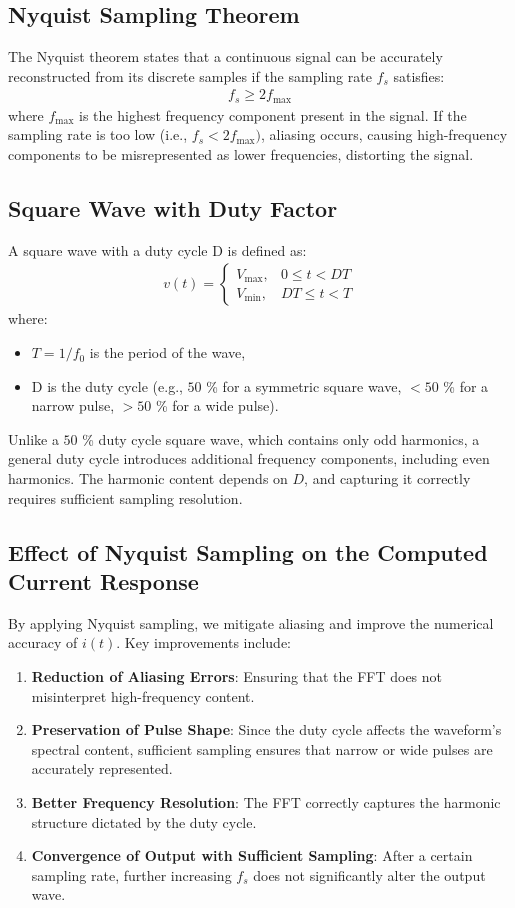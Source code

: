 \documentclass[journal]{IEEEtran}
\begin{document}
\subsection{Nyquist Sampling Theorem}
The Nyquist theorem states that a continuous signal can be accurately reconstructed from its discrete samples if the sampling rate $f_s$ satisfies:
\begin{align}
    f_s \geq 2 f_{\max}
\end{align}
where $f_{\max}$ is the highest frequency component present in the signal. If the sampling rate is too low (i.e., $f_s < 2 f_{\max})$, aliasing occurs, causing high-frequency components to be misrepresented as lower frequencies, distorting the signal.
\subsection{Square Wave with Duty Factor}
A square wave with a duty cycle D is defined as:
\begin{align}
    v(t) =
\begin{cases}
V_{\max}, & 0 \leq t < D T \\
V_{\min}, & D T \leq t < T
\end{cases}
\end{align}
where:
\begin{itemize}
    \item $T = 1/f_0$ is the period of the wave,
    \item D is the duty cycle (e.g., $50$ \% for a symmetric square wave, $<50$ \% for a narrow pulse, $>50$ \% for a wide pulse).
\end{itemize}
Unlike a $50$ \% duty cycle square wave, which contains only odd harmonics, a general duty cycle introduces additional frequency components, including even harmonics. The harmonic content depends on $D$, and capturing it correctly requires sufficient sampling resolution.
\subsection{Effect of Nyquist Sampling on the Computed Current Response}
By applying Nyquist sampling, we mitigate aliasing and improve the numerical accuracy of $i(t)$. Key improvements include:
\begin{enumerate}
    \item \textbf{Reduction of Aliasing Errors}: Ensuring that the FFT does not misinterpret high-frequency content.
    \item \textbf{Preservation of Pulse Shape}: Since the duty cycle affects the waveform's spectral content, sufficient sampling ensures that narrow or wide pulses are accurately represented.
    \item 	\textbf{Better Frequency Resolution}: The FFT correctly captures the harmonic structure dictated by the duty cycle.
    \item \textbf{Convergence of Output with Sufficient Sampling}: After a certain sampling rate, further increasing $f_s$ does not significantly alter the output wave.
\end{enumerate}
\end{document}
